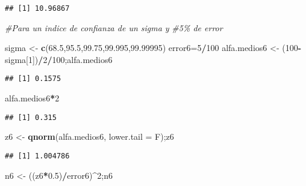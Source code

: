 \documentclass[
]{article}
\newenvironment{Shaded}{\begin{snugshade}}{\end{snugshade}}
\newcommand{\AttributeTok}[1]{\textcolor[rgb]{0.13,0.29,0.53}{#1}}
\newcommand{\CommentTok}[1]{\textcolor[rgb]{0.56,0.35,0.01}{\textit{#1}}}
\newcommand{\DecValTok}[1]{\textcolor[rgb]{0.00,0.00,0.81}{#1}}
\newcommand{\FloatTok}[1]{\textcolor[rgb]{0.00,0.00,0.81}{#1}}
\newcommand{\FunctionTok}[1]{\textcolor[rgb]{0.13,0.29,0.53}{\textbf{#1}}}
\newcommand{\NormalTok}[1]{#1}
\newcommand{\OtherTok}[1]{\textcolor[rgb]{0.56,0.35,0.01}{#1}}
\newcommand{\SpecialCharTok}[1]{\textcolor[rgb]{0.81,0.36,0.00}{\textbf{#1}}}
\begin{document}
\begin{verbatim}
## [1] 10.96867
\end{verbatim}

\begin{Shaded}
\begin{Highlighting}[]
\CommentTok{\#Para un indice de confianza de un sigma y }
\CommentTok{\#5\% de error}

\NormalTok{sigma }\OtherTok{\textless{}{-}} \FunctionTok{c}\NormalTok{(}\FloatTok{68.5}\NormalTok{,}\FloatTok{95.5}\NormalTok{,}\FloatTok{99.75}\NormalTok{,}\FloatTok{99.995}\NormalTok{,}\FloatTok{99.99995}\NormalTok{)}
\NormalTok{error6}\OtherTok{=}\DecValTok{5}\SpecialCharTok{/}\DecValTok{100}
\NormalTok{alfa.medios6 }\OtherTok{\textless{}{-}}\NormalTok{ (}\DecValTok{100}\SpecialCharTok{{-}}\NormalTok{sigma[}\DecValTok{1}\NormalTok{])}\SpecialCharTok{/}\DecValTok{2}\SpecialCharTok{/}\DecValTok{100}\NormalTok{;alfa.medios6}
\end{Highlighting}
\end{Shaded}

\begin{verbatim}
## [1] 0.1575
\end{verbatim}

\begin{Shaded}
\begin{Highlighting}[]
\NormalTok{alfa.medios6}\SpecialCharTok{*}\DecValTok{2}
\end{Highlighting}
\end{Shaded}

\begin{verbatim}
## [1] 0.315
\end{verbatim}

\begin{Shaded}
\begin{Highlighting}[]
\NormalTok{z6 }\OtherTok{\textless{}{-}} \FunctionTok{qnorm}\NormalTok{(alfa.medios6, }\AttributeTok{lower.tail =}\NormalTok{ F);z6}
\end{Highlighting}
\end{Shaded}

\begin{verbatim}
## [1] 1.004786
\end{verbatim}

\begin{Shaded}
\begin{Highlighting}[]
\NormalTok{n6 }\OtherTok{\textless{}{-}}\NormalTok{ ((z6}\SpecialCharTok{*}\FloatTok{0.5}\NormalTok{)}\SpecialCharTok{/}\NormalTok{error6)}\SpecialCharTok{\^{}}\DecValTok{2}\NormalTok{;n6}
\end{Highlighting}
\end{Shaded}
\end{document}
